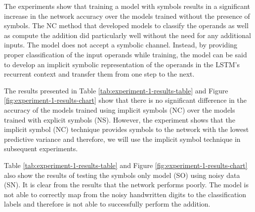 The experiments show that training a model with symbols results in a significant increase in the network accuracy over the models trained without the presence of symbols. The NC method that developed models to classify the operands as well as compute the addition did particularly well without the need for any additional inputs. The model does not accept a symbolic channel. Instead, by providing proper classification of the input operands while training, the model can be said to develop an implicit symbolic representation of the operands in the LSTM's recurrent context and transfer them from one step to the next.

The results presented in Table \ref{tab:experiment-1-results-table} and Figure \ref{fig:experiment-1-results-chart} show that there is no significant difference in the accuracy of the models trained using implicit symbols (NC) over the models trained with explicit symbols (NS). However, the experiment shows that the implicit symbol (NC) technique provides symbols to the network with the lowest predictive variance and therefore, we will use the implicit symbol technique in subsequent experiments.

Table \ref{tab:experiment-1-results-table} and Figure \ref{fig:experiment-1-results-chart} also show the results of testing the symbols only model (SO) using noisy data (SN). It is clear from the results that the network performs poorly. The model is not able to correctly map from the noisy handwritten digits to the classification labels and therefore is not able to successfully perform the addition.